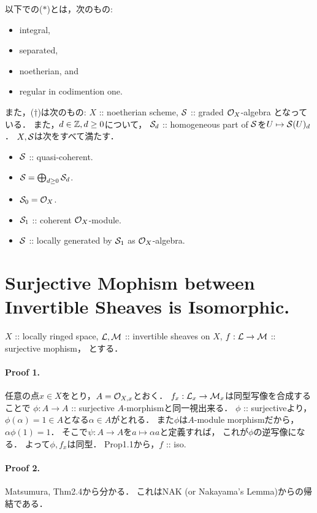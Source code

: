 \documentclass[a4paper]{jsarticle}
\begin{document}
    以下での($*$)とは，次のもの:
    \begin{itemize}
        \item integral,
        \item separated,
        \item noetherian, and
        \item regular in codimention one.
    \end{itemize}

    また，($\dagger$)は次のもの:
    $X$ :: noetherian scheme, 
    $\mathcal{S}$ :: graded $\mathcal{O}_X$-algebra
    となっている．
    また，$d \in \mathbb{Z}, d \geq 0$について，
    $\mathcal{S}_d$ :: homogeneous part of $\mathcal{S}$を$U \mapsto \mathcal{S}(U)_d$．
    $X,\mathcal{S}$は次をすべて満たす．
    \begin{itemize}
        \item $\mathcal{S}$ :: quasi-coherent.
        \item $\mathcal{S}=\bigoplus_{d \geq 0} \mathcal{S}_d$.
        \item $\mathcal{S}_0=\mathcal{O}_X$.
        \item $\mathcal{S}_1$ :: coherent $\mathcal{O}_X$-module.
        \item $\mathcal{S}$ :: locally generated by $\mathcal{S}_1$ as $\mathcal{O}_X$-algebra.
    \end{itemize}

\section{Surjective Mophism between Invertible Sheaves is Isomorphic.} %
    $X$ :: locally ringed space,
    $\mathcal{L}, \mathcal{M}$ :: invertible sheaves on $X$,
    $f: \mathcal{L} \to \mathcal{M}$ :: surjective mophism，
    とする．
    
    \paragraph{Proof 1.}
    任意の点$x \in X$をとり，$A=\mathcal{O}_{X,x}$とおく．
    $f_x: \mathcal{L}_x \to \mathcal{M}_x$は同型写像を合成することで
    $\phi: A \to A$ :: surjective $A$-morphismと同一視出来る．
    $\phi$ :: surjectiveより，
    $\phi(\alpha)=1 \in A$となる$\alpha \in A$がとれる．
    また$\phi$は$A$-module morphismだから，$\alpha \phi(1)=1$．
    そこで$\psi: A \to A$を$a \mapsto \alpha a$と定義すれば，
    これが$\phi$の逆写像になる．
    よって$\phi, f_x$は同型．
    Prop1.1から，$f$ :: iso.

    \paragraph{Proof 2.}
    Matsumura, Thm2.4から分かる．
    これはNAK (or Nakayama's Lemma)からの帰結である．
\end{document}
